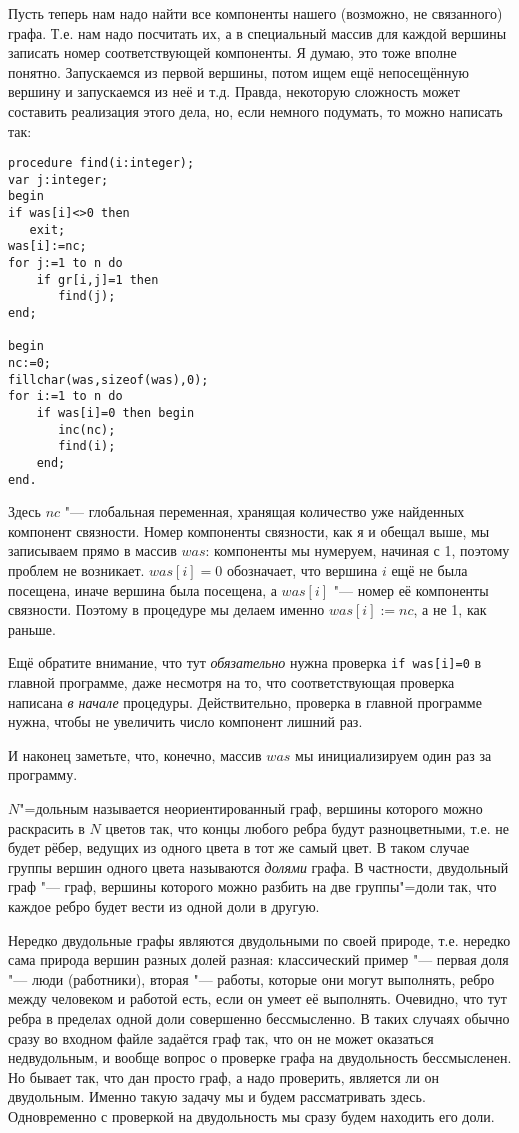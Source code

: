 Пусть теперь нам надо найти все компоненты нашего (возможно, не связанного) графа. Т.е. нам надо посчитать их, а в
специальный массив для каждой вершины записать номер соответствующей компоненты. Я думаю, это тоже вполне понятно.
Запускаемся из первой вершины, потом ищем ещё непосещённую вершину и запускаемся из неё и т.д. Правда, некоторую сложность
может составить реализация этого дела, но, если немного подумать, то можно написать так:
\begin{codesample}\begin{verbatim}
procedure find(i:integer);
var j:integer;
begin
if was[i]<>0 then
   exit;
was[i]:=nc;
for j:=1 to n do
    if gr[i,j]=1 then
       find(j);
end;

begin
nc:=0;
fillchar(was,sizeof(was),0);
for i:=1 to n do
    if was[i]=0 then begin
       inc(nc);
       find(i);
    end;
end.
\end{verbatim}
\end{codesample}

Здесь $nc$ "--- глобальная переменная, хранящая количество уже найденных компонент связности. Номер компоненты связности,
как я и обещал выше, мы записываем прямо в массив $was$: компоненты мы нумеруем, начиная с 1, поэтому проблем не возникает.
$was[i]=0$ обозначает, что вершина $i$ ещё не была посещена, иначе вершина была посещена, а $was[i]$ "--- номер
её компоненты связности. Поэтому в процедуре мы делаем именно $was[i]:=nc$, а не 1, как раньше.

Ещё обратите внимание, что тут \textit{обязательно} нужна проверка \texttt{if was[i]=0} в главной программе, даже
несмотря на то, что соответствующая проверка написана \textit{в начале} процедуры. Действительно, проверка в главной
программе нужна, чтобы не увеличить число компонент лишний раз.

И наконец заметьте, что, конечно, массив $was$ мы инициализируем один раз за программу.

$N$"=дольным называется неориентированный граф, вершины которого можно раскрасить в $N$ цветов так, что концы любого 
ребра будут разноцветными, т.е. не будет рёбер, ведущих из одного цвета в тот же самый цвет. В 
таком случае группы вершин одного цвета называются \textit{долями} графа. В частности, двудольный 
граф "--- граф, вершины которого можно разбить на две группы"=доли так, что каждое ребро будет 
вести из одной доли в другую.

Нередко двудольные графы являются двудольными по 
своей природе, т.е. нередко сама природа вершин разных долей разная: классический пример "--- 
первая доля "--- люди (работники), вторая "--- работы, которые они могут выполнять, ребро между 
человеком и работой есть, если он умеет её выполнять. Очевидно, что тут ребра в пределах одной доли 
совершенно бессмысленно. В таких случаях обычно сразу во входном файле задаётся граф так, что он не 
может оказаться недвудольным, и вообще вопрос о проверке графа на двудольность бессмысленен. Но 
бывает так, что дан просто граф, а надо проверить, является ли он двудольным. Именно такую задачу мы 
и будем рассматривать здесь. Одновременно с проверкой на двудольность мы сразу будем находить его 
доли. 

